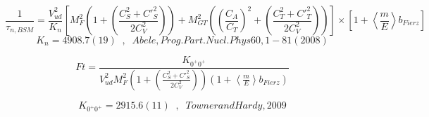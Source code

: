\documentclass{beamer}
\begin{document}
{\Tiny

$$
 \frac{1}{\tau_{n, BSM}} = \frac{V_{ud}^2}{K_n} \left[ M^2_F \left(  1 + \left( \frac{ C^2_S + C'^2_S}{2 C^2_V} \right) \right) + M^2_{GT} \left(  \left(\frac{C_A}{C_T}\right)^2 + \left( \frac{ C^2_T + C'^2_T}{2 C^2_V} \right) \right)\right]  \times \left[ 1 + \left< \frac{m}{E}  \right > b_{Fierz} \right]
$$
$$
K_n = 4908.7(19) \;\; , \;\;  Abele, Prog. Part. Nucl. Phys 60, 1-81 (2008)
$$

\vspace{0.5cm}

$$
Ft = \frac{K_{0^+0^+}}{V_{ud}^2 M^2_F  \left( 1 +  \left( \frac{ C^2_S + C'^2_S}{2 C^2_V} \right) \right) \left(  1 + \left< \frac{m}{E}  \right > b_{Fierz} \right) }
$$

$$
K_{0^+0^+} = 2915.6(11) \;\; , \;\;  Towner and Hardy, 2009
$$

}
\end{document}
